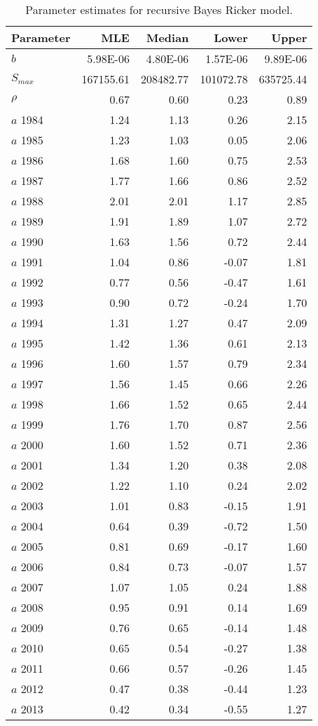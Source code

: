 \begin{table}[ht]
\centering
\caption{Parameter estimates for recursive Bayes Ricker model.} 
\label{estparrec}
\begin{tabular}{lrrrr}
  \hline
Parameter & MLE & Median & Lower & Upper \\ 
  \hline
$b$ & 5.98E-06 & 4.80E-06 & 1.57E-06 & 9.89E-06 \\ 
  $S_{max}$ & 167155.61 & 208482.77 & 101072.78 & 635725.44 \\ 
  $\rho$ & 0.67 & 0.60 & 0.23 & 0.89 \\ 
  $a$ 1984 & 1.24 & 1.13 & 0.26 & 2.15 \\ 
  $a$ 1985 & 1.23 & 1.03 & 0.05 & 2.06 \\ 
  $a$ 1986 & 1.68 & 1.60 & 0.75 & 2.53 \\ 
  $a$ 1987 & 1.77 & 1.66 & 0.86 & 2.52 \\ 
  $a$ 1988 & 2.01 & 2.01 & 1.17 & 2.85 \\ 
  $a$ 1989 & 1.91 & 1.89 & 1.07 & 2.72 \\ 
  $a$ 1990 & 1.63 & 1.56 & 0.72 & 2.44 \\ 
  $a$ 1991 & 1.04 & 0.86 & -0.07 & 1.81 \\ 
  $a$ 1992 & 0.77 & 0.56 & -0.47 & 1.61 \\ 
  $a$ 1993 & 0.90 & 0.72 & -0.24 & 1.70 \\ 
  $a$ 1994 & 1.31 & 1.27 & 0.47 & 2.09 \\ 
  $a$ 1995 & 1.42 & 1.36 & 0.61 & 2.13 \\ 
  $a$ 1996 & 1.60 & 1.57 & 0.79 & 2.34 \\ 
  $a$ 1997 & 1.56 & 1.45 & 0.66 & 2.26 \\ 
  $a$ 1998 & 1.66 & 1.52 & 0.65 & 2.44 \\ 
  $a$ 1999 & 1.76 & 1.70 & 0.87 & 2.56 \\ 
  $a$ 2000 & 1.60 & 1.52 & 0.71 & 2.36 \\ 
  $a$ 2001 & 1.34 & 1.20 & 0.38 & 2.08 \\ 
  $a$ 2002 & 1.22 & 1.10 & 0.24 & 2.02 \\ 
  $a$ 2003 & 1.01 & 0.83 & -0.15 & 1.91 \\ 
  $a$ 2004 & 0.64 & 0.39 & -0.72 & 1.50 \\ 
  $a$ 2005 & 0.81 & 0.69 & -0.17 & 1.60 \\ 
  $a$ 2006 & 0.84 & 0.73 & -0.07 & 1.57 \\ 
  $a$ 2007 & 1.07 & 1.05 & 0.24 & 1.88 \\ 
  $a$ 2008 & 0.95 & 0.91 & 0.14 & 1.69 \\ 
  $a$ 2009 & 0.76 & 0.65 & -0.14 & 1.48 \\ 
  $a$ 2010 & 0.65 & 0.54 & -0.27 & 1.38 \\ 
  $a$ 2011 & 0.66 & 0.57 & -0.26 & 1.45 \\ 
  $a$ 2012 & 0.47 & 0.38 & -0.44 & 1.23 \\ 
  $a$ 2013 & 0.42 & 0.34 & -0.55 & 1.27 \\ 
   \hline
\end{tabular}
\end{table}
